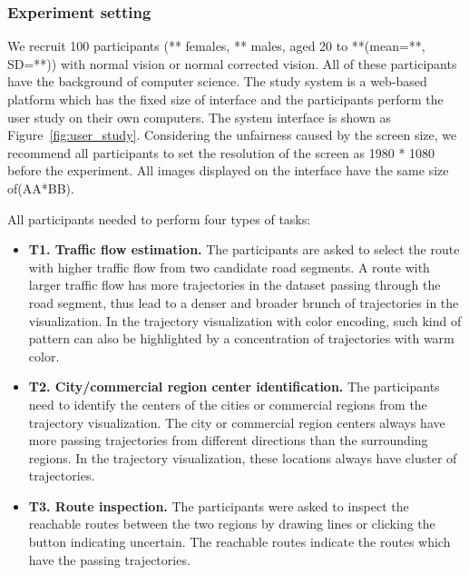 \subsubsection{Experiment setting}

We recruit 100 participants (** females, ** males, aged 20 to **(mean=**, SD=**)) with normal vision or normal corrected vision. All of these participants have the background of computer science. 
The study system is a web-based platform which has the fixed size of interface and the participants perform the user study on their own  computers.  The system interface is shown as Figure~\ref{fig:user_study}. Considering the unfairness caused by the screen size, we recommend all participants to set the resolution of the screen as 1980 * 1080 before the experiment. All images displayed on the interface have the same size of(AA*BB).  

All participants needed to perform four types of tasks:
\begin{itemize}[noitemsep]
	\item \textbf{T1. Traffic flow estimation.} 
	The participants are asked to select the route with higher traffic flow from two candidate road segments.
	A route with larger traffic flow has more trajectories in the dataset passing through the road segment, thus lead to a denser and broader brunch of trajectories in the visualization.  In the trajectory visualization with color encoding, such kind of pattern can also be highlighted by a concentration of trajectories with warm color.
	\item \textbf{T2. City/commercial region center identification.} The participants need to identify the centers of the cities or commercial regions from the trajectory visualization. The city or commercial region centers always have more passing trajectories from different directions than the surrounding regions. In the trajectory visualization, these locations always have  cluster of trajectories.
	\item \textbf{T3. Route inspection.} The participants were asked to inspect the reachable routes between the two regions by drawing lines or clicking the button indicating uncertain. The reachable routes indicate the routes which have the passing trajectories.
\end{itemize}


